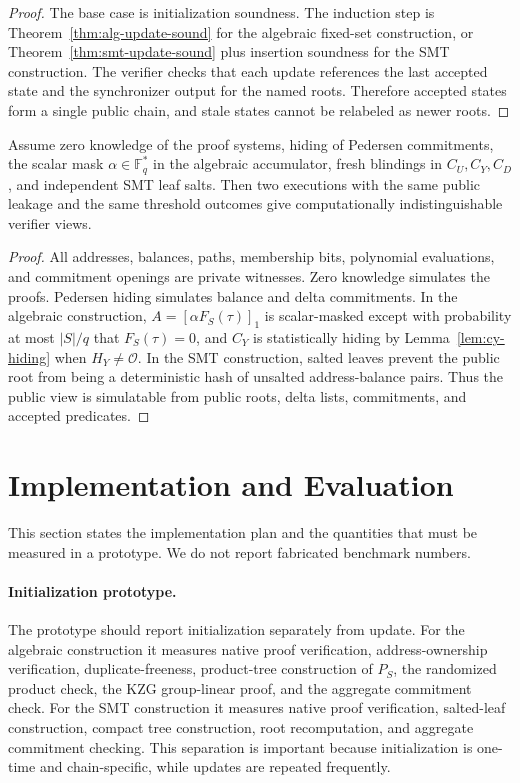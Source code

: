 \documentclass[runningheads]{llncs}
\newcommand{\F}{\mathbb{F}}
\begin{document}
\begin{proof}
The base case is initialization soundness.  The induction step is Theorem~\ref{thm:alg-update-sound} for the algebraic fixed-set construction, or Theorem~\ref{thm:smt-update-sound} plus insertion soundness for the SMT construction.  The verifier checks that each update references the last accepted state and the synchronizer output for the named roots.  Therefore accepted states form a single public chain, and stale states cannot be relabeled as newer roots.
\end{proof}

\begin{theorem}[Privacy]
Assume zero knowledge of the proof systems, hiding of Pedersen commitments, the scalar mask \(\alpha\in\F_q^*\) in the algebraic accumulator, fresh blindings in \(C_U,C_Y,C_D\), and independent SMT leaf salts.  Then two executions with the same public leakage and the same threshold outcomes give computationally indistinguishable verifier views.
\end{theorem}

\begin{proof}
All addresses, balances, paths, membership bits, polynomial evaluations, and commitment openings are private witnesses.  Zero knowledge simulates the proofs.  Pedersen hiding simulates balance and delta commitments.  In the algebraic construction, \(A=[\alpha F_S(\tau)]_1\) is scalar-masked except with probability at most \(|S|/q\) that \(F_S(\tau)=0\), and \(C_Y\) is statistically hiding by Lemma~\ref{lem:cy-hiding} when \(H_Y\ne\mathcal O\).  In the SMT construction, salted leaves prevent the public root from being a deterministic hash of unsalted address-balance pairs.  Thus the public view is simulatable from public roots, delta lists, commitments, and accepted predicates.
\end{proof}

\section{Implementation and Evaluation}

This section states the implementation plan and the quantities that must be measured in a prototype.  We do not report fabricated benchmark numbers.

\paragraph{Initialization prototype.}
The prototype should report initialization separately from update.  For the algebraic construction it measures native proof verification, address-ownership verification, duplicate-freeness, product-tree construction of \(P_S\), the randomized product check, the KZG group-linear proof, and the aggregate commitment check.  For the SMT construction it measures native proof verification, salted-leaf construction, compact tree construction, root recomputation, and aggregate commitment checking.  This separation is important because initialization is one-time and chain-specific, while updates are repeated frequently.
\end{document}
